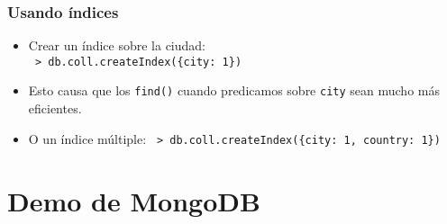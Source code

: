 \begin{frame}
\frametitle{Usando índices}
\begin{itemize}

\item	Crear un índice sobre la ciudad: \\
	\texttt{\footnotesize
		> db.coll.createIndex(\{city: 1\})
	}
	\pause

\item	Esto causa que los \texttt{find()} cuando predicamos sobre
	\texttt{city} sean mucho más eficientes.
	\pause

\item	O un índice múltiple:
	\texttt{\footnotesize
		> db.coll.createIndex(\{city: 1, country: 1\})
	}

\end{itemize}
\end{frame}

\section{Demo de MongoDB}
